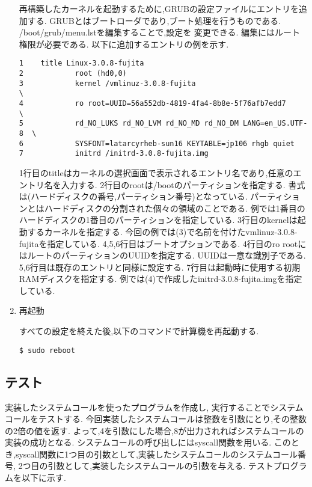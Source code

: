 \documentclass[12pt]{jsarticle}
\begin{document}
\begin{enumerate}
再構築したカーネルを起動するために,GRUBの設定ファイルにエントリを追加する.
GRUBとはブートローダであり,ブート処理を行うものである.
/boot/grub/menu.lstを編集することで,設定を
変更できる.
編集にはルート権限が必要である.
以下に追加するエントリの例を示す.

\begin{verbatim}
1    title Linux-3.0.8-fujita
2            root (hd0,0)
3            kernel /vmlinuz-3.0.8-fujita                             \
4            ro root=UUID=56a552db-4819-4fa4-8b8e-5f76afb7edd7        \
5            rd_NO_LUKS rd_NO_LVM rd_NO_MD rd_NO_DM LANG=en_US.UTF-8  \
6            SYSFONT=latarcyrheb-sun16 KEYTABLE=jp106 rhgb quiet  
7            initrd /initrd-3.0.8-fujita.img
\end{verbatim}

1行目のtitleはカーネルの選択画面で表示されるエントリ名であり,任意のエントリ名を入力する.
2行目のrootは/bootのパーティションを指定する.
書式は(ハードディスクの番号,パーティション番号)となっている.
パーティションとはハードディスクの分割された個々の領域のことである.
例では1番目のハードディスクの1番目のパーティションを指定している.
3行目のkernelは起動するカーネルを指定する.
今回の例では(3)で名前を付けたvmlinuz-3.0.8-fujitaを指定している.
4,5,6行目はブートオプションである.
4行目のro rootにはルートのパーティションのUUIDを指定する.
UUIDは一意な識別子である.
5,6行目は既存のエントリと同様に設定する.
7行目は起動時に使用する初期RAMディスクを指定する.
例では(4)で作成したinitrd-3.0.8-fujita.imgを指定している.

\item 再起動

すべての設定を終えた後,以下のコマンドで計算機を再起動する.

\begin{verbatim}
$ sudo reboot
\end{verbatim}

\end{enumerate}
\subsection{テスト}

実装したシステムコールを使ったプログラムを作成し,
実行することでシステムコールをテストする.
今回実装したシステムコールは整数を引数にとり,その整数の2倍の値を返す.
よって,4を引数にした場合,8が出力されればシステムコールの実装の成功となる.
システムコールの呼び出しにはsyscall関数を用いる.
このとき,syscall関数に1つ目の引数として,実装したシステムコールのシステムコール番号,
2つ目の引数として,実装したシステムコールの引数を与える.
テストプログラムを以下に示す.
\end{document}
